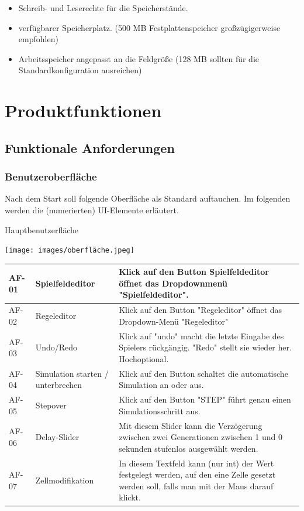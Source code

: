 \documentclass[11pt,a4paper]{article}
\begin{document}
\begin{itemize}
    \item Schreib- und Leserechte für die Speicherstände.
    \item verfügbarer Speicherplatz. (500 MB Festplattenspeicher großzügigerweise empfohlen)
    \item Arbeitsspeicher angepasst an die Feldgröße (128 MB sollten für die Standardkonfiguration ausreichen)
\end{itemize}

\pagebreak



\section{Produktfunktionen}
\subsection{Funktionale Anforderungen}
\subsubsection{Benutzeroberfläche}
Nach dem Start soll folgende Oberfläche als Standard auftauchen. Im folgenden werden die (numerierten) UI-Elemente erläutert.
\par
Hauptbenutzerfläche
\par
\texttt{[image: images/oberfläche.jpeg]}

\begin{longtable}[m]{|m{2cm}|m{4cm}|m{9cm}|}
\hline
 AF-01 & Spielfeldeditor & Klick auf den Button Spielfeldeditor öffnet das Dropdownmenü "Spielfeldeditor".   \\
 \hline
AF-02 & Regeleditor & Klick auf den Button "Regeleditor" öffnet das Dropdown-Menü "Regeleditor" \\
 \hline
AF-03& Undo/Redo& Klick auf "undo" macht die letzte Eingabe des Spielers rückgängig. "Redo" stellt sie wieder her. Hochoptional. \\
 \hline
 AF-04 & Simulation starten / unterbrechen & Klick auf den Button schaltet die automatische Simulation an oder aus. \\
 \hline
 AF-05& Stepover & Klick auf den Button "STEP" führt genau einen Simulationsschritt aus.  \\

\hline
 AF-06 & Delay-Slider & Mit diesem Slider kann die Verzögerung zwischen zwei Generationen zwischen 1 und 0 sekunden stufenlos ausgewählt werden. \\
 \hline
 AF-07 & Zellmodifikation & In diesem Textfeld kann (nur int) der Wert festgelegt werden, auf den eine Zelle gesetzt werden soll, falls man mit der Maus darauf klickt.  \\
\hline
\end{longtable}
\end{document}
